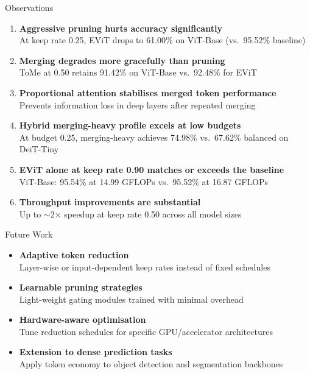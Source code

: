 \documentclass[aspectratio=169, 11pt]{beamer}
\begin{document}
\begin{frame}{Observations}
\begin{enumerate}
  \item \textbf{Aggressive pruning hurts accuracy significantly}\\
        At keep rate 0.25, EViT drops to 61.00\% on ViT-Base (vs.\ 95.52\% baseline)
  \item \textbf{Merging degrades more gracefully than pruning}\\
        ToMe at 0.50 retains 91.42\% on ViT-Base vs.\ 92.48\% for EViT
  \item \textbf{Proportional attention stabilises merged token performance}\\
        Prevents information loss in deep layers after repeated merging
  \item \textbf{Hybrid merging-heavy profile excels at low budgets}\\
        At budget 0.25, merging-heavy achieves 74.98\% vs.\ 67.62\% balanced on DeiT-Tiny
  \item \textbf{EViT alone at keep rate 0.90 matches or exceeds the baseline}\\
        ViT-Base: 95.54\% at 14.99 GFLOPs vs.\ 95.52\% at 16.87 GFLOPs
  \item \textbf{Throughput improvements are substantial}\\
        Up to $\sim$2$\times$ speedup at keep rate 0.50 across all model sizes
\end{enumerate}
\end{frame}

\begin{frame}{Future Work}
\begin{itemize}
  \item \textbf{Adaptive token reduction}\\
        Layer-wise or input-dependent keep rates instead of fixed schedules
  \item \textbf{Learnable pruning strategies}\\
        Light-weight gating modules trained with minimal overhead
  \item \textbf{Hardware-aware optimisation}\\
        Tune reduction schedules for specific GPU/accelerator architectures
  \item \textbf{Extension to dense prediction tasks}\\
        Apply token economy to object detection and segmentation backbones
\end{itemize}
\end{frame}
\end{document}
